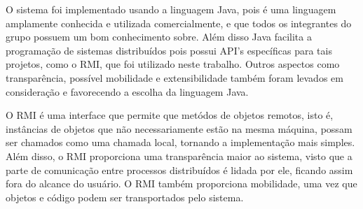 \documentclass[../main.tex]{subfiles}
\begin{document}
O sistema foi implementado usando a linguagem Java, pois é uma linguagem amplamente conhecida e utilizada comercialmente, e que todos os integrantes do grupo possuem um bom conhecimento sobre. Além disso Java facilita a programação de sistemas distribuídos pois possui API's específicas para tais projetos, como o RMI, que foi utilizado neste trabalho. Outros aspectos como transparência, possível mobilidade e extensibilidade também foram levados em consideração e favorecendo a escolha da linguagem Java.

O RMI é uma interface que permite que metódos de objetos remotos, isto é, instâncias de objetos que não necessariamente estão na mesma máquina, possam ser chamados como uma chamada local, tornando a implementação mais simples. Além disso, o RMI proporciona uma transparência maior ao sistema, visto que a parte de comunicação entre processos distribuídos é lidada por ele, ficando assim fora do alcance do usuário. O RMI também proporciona mobilidade, uma vez que objetos e código podem ser transportados pelo sistema.
\end{document}
